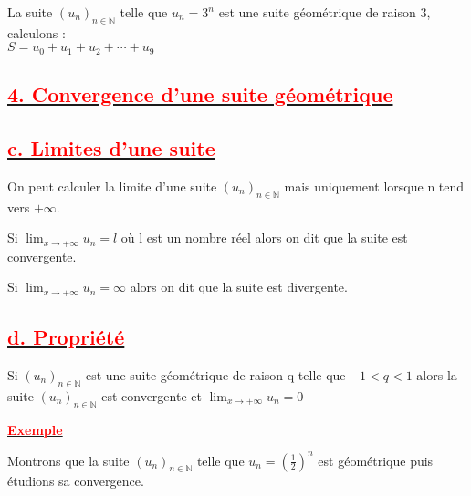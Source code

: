 \documentclass[12pt]{article}
\begin{document}
La suite $(u_{n})_{n\in\mathbb{N}}$ telle que $u_{n} =3^{n}$ est une suite géométrique de raison 3, calculons :\\
$S = u_{0} + u_{1} + u_{2} +\cdots+u_{9}$
\subsection*{\underline{\textbf{\textcolor{red}{4. Convergence d’une suite géométrique}}}}
\subsection*{\underline{\textbf{\textcolor{red}{c. Limites d’une suite}}}}
On peut calculer la limite d’une suite $(u_{n})_{n\in\mathbb{N}}$ mais uniquement lorsque n tend vers $+\infty$.

Si $\lim_{x \to +\infty}u_{n} = l$ où l est un nombre réel alors on dit que la suite est convergente.

Si $\lim_{x \to +\infty}u_{n} = \infty$ alors on dit que la suite est divergente.
\subsection*{\underline{\textbf{\textcolor{red}{d. Propriété}}}}
Si $(u_{n})_{n\in\mathbb{N}}$ est une suite géométrique de raison q telle que $-1 < q < 1$ alors la suite 
$(u_{n})_{n\in\mathbb{N}}$ est convergente et $\lim_{x \to +\infty}u_{n} = 0$

\underline{\textbf{\textcolor{red}{Exemple}}}

Montrons que la suite $(u_{n})_{n\in\mathbb{N}}$ telle que $u_{n}=(\frac{1}{2})^{n}$ est géométrique puis étudions sa convergence.
\end{document}
